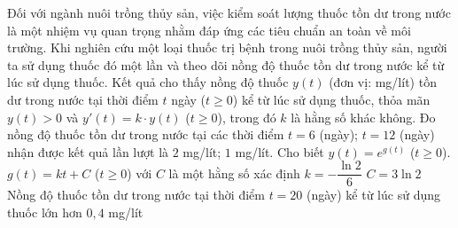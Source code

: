 \begin{vd}[BGD-2025]%
 Đối với ngành nuôi trồng thủy sản, việc kiểm soát lượng thuốc tồn dư trong nước là một nhiệm vụ quan trọng nhằm đáp ứng các tiêu chuẩn an toàn về môi trường. Khi nghiên cứu một loại thuốc trị bệnh trong nuôi trồng thủy sản, người ta sử dụng thuốc đó một lần và theo dõi nồng độ thuốc tồn dư trong nước kể từ lúc sử dụng thuốc. Kết quả cho thấy nồng độ thuốc $y(t)$ (đơn vị: mg/lít) tồn dư trong nước tại thời điểm $t$ ngày ($t \ge 0$) kể từ lúc sử dụng thuốc, thỏa mãn $y(t)>0$ và $y'(t)=k \cdot y(t)$ ($t \ge 0$), trong đó $k$ là hằng số khác không. Đo nồng độ thuốc tồn dư trong nước tại các thời điểm $t=6$ (ngày); $t=12$ (ngày) nhận được kết quả lần lượt là $2$ mg/lít; $1$ mg/lít. Cho biết $y(t)=e^{g(t)}$ ($t \ge 0$).
 \choiceTF
 {\True $g(t)=kt+C$ ($t \ge 0$) với $C$ là một hằng số xác định}
 {\True $k=-\dfrac{\ln 2}{6}$}
 {$C=3 \ln 2$}
 {Nồng độ thuốc tồn dư trong nước tại thời điểm $t=20$ (ngày) kể từ lúc sử dụng thuốc lớn hơn $0,4$ mg/lít}
\end{vd}

